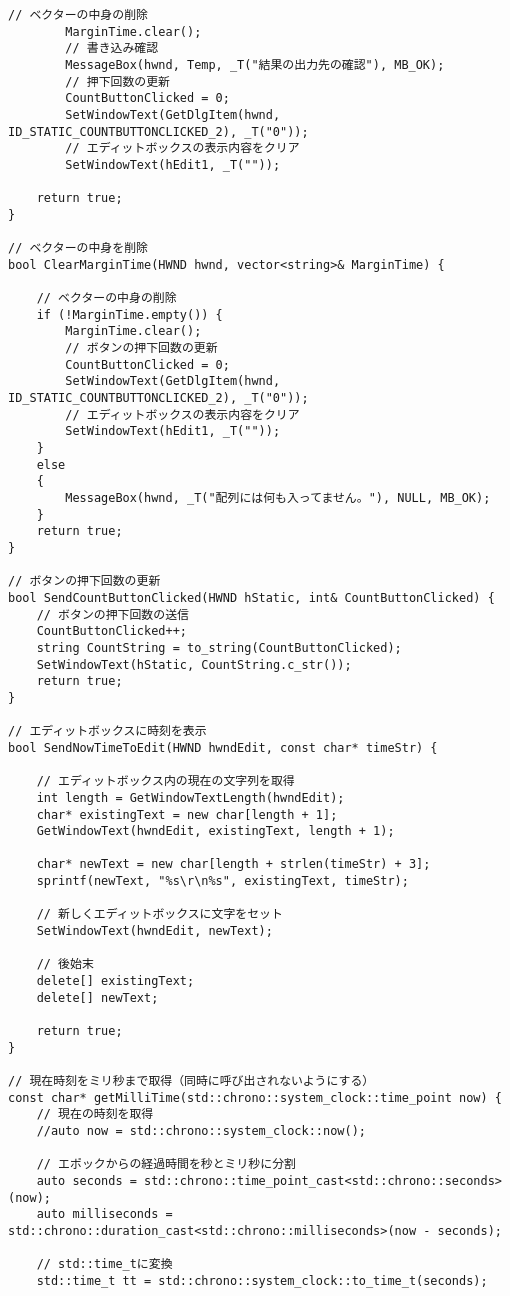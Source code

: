 \begin{lstlisting}[caption=main.cpp]
		// ベクターの中身の削除
		MarginTime.clear();
		// 書き込み確認
		MessageBox(hwnd, Temp, _T("結果の出力先の確認"), MB_OK);
		// 押下回数の更新
		CountButtonClicked = 0;
		SetWindowText(GetDlgItem(hwnd, ID_STATIC_COUNTBUTTONCLICKED_2), _T("0"));
		// エディットボックスの表示内容をクリア
		SetWindowText(hEdit1, _T(""));

	return true;
}

// ベクターの中身を削除
bool ClearMarginTime(HWND hwnd, vector<string>& MarginTime) {

	// ベクターの中身の削除
	if (!MarginTime.empty()) {
		MarginTime.clear();
		// ボタンの押下回数の更新
		CountButtonClicked = 0;
		SetWindowText(GetDlgItem(hwnd, ID_STATIC_COUNTBUTTONCLICKED_2), _T("0"));
		// エディットボックスの表示内容をクリア
		SetWindowText(hEdit1, _T(""));
	}
	else
	{
		MessageBox(hwnd, _T("配列には何も入ってません。"), NULL, MB_OK);
	}
	return true;
}

// ボタンの押下回数の更新
bool SendCountButtonClicked(HWND hStatic, int& CountButtonClicked) {
	// ボタンの押下回数の送信
	CountButtonClicked++;
	string CountString = to_string(CountButtonClicked);
	SetWindowText(hStatic, CountString.c_str());
	return true;
}

// エディットボックスに時刻を表示
bool SendNowTimeToEdit(HWND hwndEdit, const char* timeStr) {

	// エディットボックス内の現在の文字列を取得
	int length = GetWindowTextLength(hwndEdit);
	char* existingText = new char[length + 1];
	GetWindowText(hwndEdit, existingText, length + 1);

	char* newText = new char[length + strlen(timeStr) + 3];
	sprintf(newText, "%s\r\n%s", existingText, timeStr);

	// 新しくエディットボックスに文字をセット
	SetWindowText(hwndEdit, newText);

	// 後始末
	delete[] existingText;
	delete[] newText;

	return true;
}

// 現在時刻をミリ秒まで取得（同時に呼び出されないようにする）
const char* getMilliTime(std::chrono::system_clock::time_point now) {
	// 現在の時刻を取得
	//auto now = std::chrono::system_clock::now();

	// エポックからの経過時間を秒とミリ秒に分割
	auto seconds = std::chrono::time_point_cast<std::chrono::seconds>(now);
	auto milliseconds = std::chrono::duration_cast<std::chrono::milliseconds>(now - seconds);

	// std::time_tに変換
	std::time_t tt = std::chrono::system_clock::to_time_t(seconds);


\end{lstlisting}
